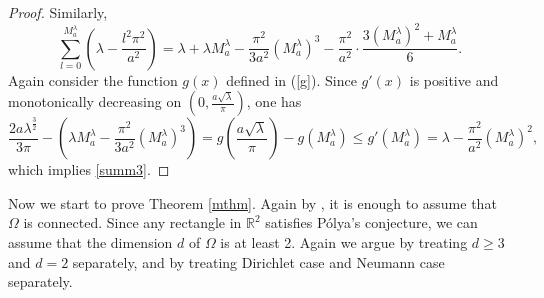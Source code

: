 \documentclass[11pt,letterpaper]{amsart}
\numberwithin{equation}{section}
\theoremstyle{plain}
\theoremstyle{plain}
\numberwithin{equation}{section}
\theoremstyle{remark}
\begin{document}
\begin{proof}
		Similarly,
		\begin{equation*}  
			\sum_{l=0}^{M_a^\lambda} (\lambda-\frac{l^2\pi^2}{a^2}) 
			=  \lambda+ \lambda M_a^\lambda-\frac{\pi^2}{3a^2}(M_a^\lambda)^3-\frac{\pi^2}{a^2} \cdot \frac{3(M_a^\lambda)^2+M_a^\lambda}{6}.  
		\end{equation*}
		Again consider the function $g(x)$   defined in (\ref{g}). Since 
		$g'(x)$	is positive and monotonically decreasing on $(0,\frac{a\sqrt\lambda}{\pi})$, one has
		\begin{equation*} \label{10}
			\frac{2a\lambda^{\frac{3}{2}}}{3\pi}-(\lambda M_a^\lambda -\frac{\pi^2}{3a^2} (M_a^\lambda)^3)= g(\frac{a\sqrt\lambda}{\pi})-g(M_a^\lambda) \le g'(M_a^\lambda)= \lambda-\frac{\pi^2}{a^2}(M_a^\lambda)^2,
		\end{equation*}
		which implies \eqref{summ3}.

	\end{proof}
	
	
	Now we start to prove Theorem \ref{mthm}. Again  by   \cite[Proposition 3.1]{FLP}, it is enough to assume that $\Omega$ is connected. Since any rectangle in $\mathbb{R}^2$ satisfies P\'olya's conjecture, we can assume that the dimension $d$ of $\Omega$ is at least 2. Again we argue by treating $d \ge 3$ and $d=2$ separately, and by treating Dirichlet case and Neumann case separately.  
	
\end{document}
